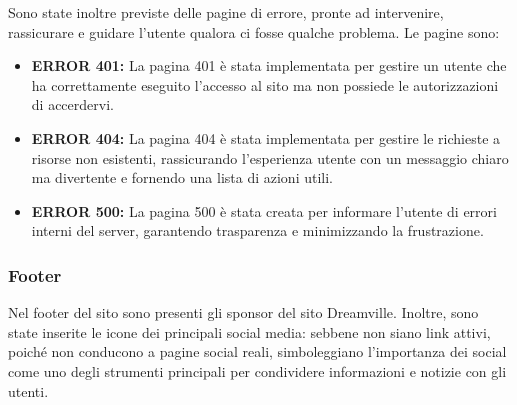 Sono state inoltre previste delle pagine di errore, pronte ad intervenire, rassicurare e guidare l'utente qualora ci fosse qualche problema.
Le pagine sono:
\begin{itemize}
    \item \textbf{ERROR 401:} La pagina 401 è stata implementata per gestire un utente che ha correttamente eseguito l'accesso al sito ma non possiede le autorizzazioni di accerdervi.
    \item \textbf{ERROR 404:} La pagina 404 è stata implementata per gestire le richieste a risorse non esistenti, rassicurando l'esperienza utente con un messaggio chiaro ma divertente e fornendo una lista di azioni utili.
    \item \textbf{ERROR 500:} La pagina 500 è stata creata per informare l'utente di errori interni del server, garantendo trasparenza e minimizzando la frustrazione.
\end{itemize}
\subsubsection{Footer}
Nel footer del sito sono presenti gli sponsor del sito Dreamville. Inoltre, sono state inserite le icone dei principali social media: sebbene non siano link attivi, poiché non conducono a pagine social reali, simboleggiano l'importanza dei social come uno degli strumenti principali per condividere informazioni e notizie con gli utenti.

